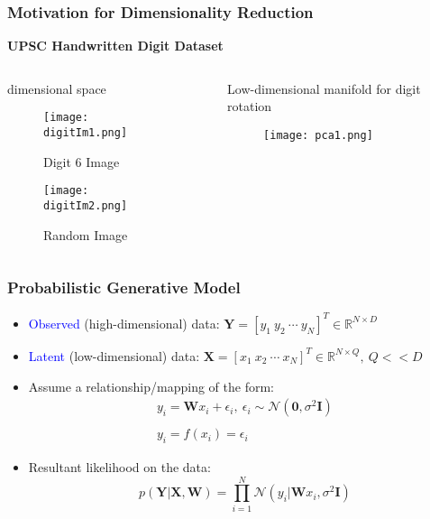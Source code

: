 \documentclass[10pt,handout]{beamer}
\begin{document}
\begin{frame}
\frametitle{Motivation for Dimensionality Reduction}

\begin{center}
  \textbf{UPSC Handwritten Digit Dataset}
\end{center}

\begin{columns}[t]
  \begin{column}[t]{0.3\textwidth}
     dimensional space
    \begin{figure}
      \centering
      \caption*{Digit 6 Image}
      \texttt{[image: digitIm1.png]}
    \end{figure}
    \begin{figure}
      \centering
      \caption*{Random Image}
      \texttt{[image: digitIm2.png]}
    \end{figure}
  \end{column}
  \begin{column}{0.6\textwidth}
    \centering
    Low-dimensional manifold for digit rotation
    \begin{figure}
      \centering
      \texttt{[image: pca1.png]}
    \end{figure}    
  \end{column}
\end{columns}

\end{frame}

\begin{frame}
\frametitle{Probabilistic Generative Model}

\begin{itemize}
  \item \textcolor{blue}{Observed} (high-dimensional) data: $\mathbf{Y} = [y_1~y_2~\cdots~y_N]^T \in \mathbb{R}^{N \times D}$      
  \item \textcolor{blue}{Latent} (low-dimensional) data: $\mathbf{X} = [x_1~x_2~\cdots~x_N]^T \in \mathbb{R}^{N \times Q},~Q << D$
  \item Assume a relationship/mapping of the form:
    \begin{equation}
      \begin{array}{c}
        y_i = \mathbf{W}x_i + \epsilon_i,~\epsilon_i \sim \mathcal{N}(\mathbf{0},\sigma^2\mathbf{I})\\~\\
        y_i = f(x_i) = \epsilon_i
      \end{array}
    \end{equation}
  \item Resultant likelihood on the data:
    \begin{equation}
      p(\mathbf{Y}|\mathbf{X},\mathbf{W}) = \prod_{i = 1}^N \mathcal{N}(y_i | \mathbf{W}x_i, \sigma^2\mathbf{I})
    \end{equation}
\end{itemize}

\end{frame}
\end{document}
